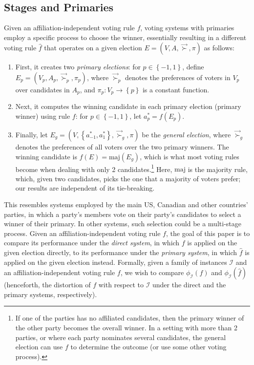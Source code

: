 \documentclass[letterpaper]{article} %
\theoremstyle{definition}
\newcommand{\set}[1]{\left\{#1\right\}}
\renewcommand{\vec}{\overrightarrow}
\renewcommand{\hat}{\widehat}
\newcommand{\calI}{\mathcal{I}}
\newcommand{\vsucc}{\vec{\succ}}
\newcommand{\pleft}{-1}
\newcommand{\pright}{1}
\newcommand{\maj}{\textrm{maj}}
\begin{document}
\subsection{Stages and Primaries}
Given an affiliation-independent voting rule $f$, voting systems with primaries employ a specific process to choose the winner, essentially resulting in a different voting rule $\hat{f}$ that operates on a given election $E = (V,A,\vsucc,\pi)$ as follows:
\begin{enumerate}
	\item First, it creates two \emph{primary elections}: for $p \in \set{\pleft,\pright}$, define $E_p = (V_p,A_p,\vsucc_p,\pi_p)$, where $\vsucc_p$ denotes the preferences of voters in $V_p$ over candidates in $A_p$, and $\pi_p : V_p \to \set{p}$ is a constant function.
	\item Next, it computes the winning candidate in each primary election (primary winner) using rule $f$: for $p \in \set{\pleft,\pright}$, let $a^*_p = f(E_p)$.
	\item Finally, let $E_g = (V,\set{a^*_{\pleft},a^*_{\pright}},\vsucc_g,\pi)$ be the \emph{general election}, where $\vsucc_g$ denotes the preferences of all voters over the two primary winners. The winning candidate is $\hat{f}(E) = \maj(E_g)$, which is what most voting rules become when dealing with only 2 candidates.\footnote{If one of the parties has no affiliated candidates, then the primary winner of the other party becomes the overall winner. In a setting with more than 2 parties, or where each party nominates several candidates, the general election can use $f$ to determine the outcome (or use some other voting process).} Here, $\maj$ is the majority rule, which, given two candidates, picks the one that a majority of voters prefer; our results are independent of its tie-breaking.
\end{enumerate}
This resembles systems employed by the main US, Canadian and other countries' parties, in which a party's members vote on their party's candidates to select a winner of their primary. In other systems, such selection could be a multi-stage process.
Given an affiliation-independent voting rule $f$, the goal of this paper is to compare its performance under the \emph{direct system}, in which $f$ is applied on the given election directly, to its performance under the \emph{primary system}, in which $\hat{f}$ is applied on the given election instead. Formally, given a family of instances $\calI$ and an affiliation-independent voting rule $f$, we wish to compare $\phi_{\calI}(f)$ and $\phi_{\calI}(\hat{f})$ (henceforth, the distortion of $f$ with respect to $\calI$ under the direct and the primary systems, respectively).
\end{document}
